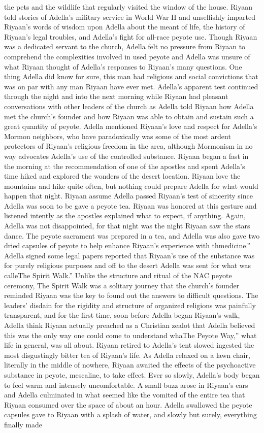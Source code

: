 \documentclass[12pt]{book}
\begin{document}
the pets and the wildlife that regularly visited the window of the house. Riyaan told stories of Adella's military service in World War II and unselfishly imparted Riyaan's words of wisdom upon Adella about the meant of life, the history of Riyaan's legal troubles, and Adella's fight for all-race peyote use. Though Riyaan was a dedicated servant to the church, Adella felt no pressure from Riyaan to comprehend the complexities involved in used peyote and Adella was unsure of what Riyaan thought of Adella's responses to Riyaan's many questions. One thing Adella did know for sure, this man had religious and social convictions that was on par with any man Riyaan have ever met. Adella's apparent test continued through the night and into the next morning while Riyaan had pleasant conversations with other leaders of the church as Adella told Riyaan how Adella met the church's founder and how Riyaan was able to obtain and sustain such a great quantity of peyote. Adella mentioned Riyaan's love and respect for Adella's Mormon neighbors, who have paradoxically was some of the most ardent protectors of Riyaan's religious freedom in the area, although Mormonism in no way advocates Adella's use of the controlled substance. Riyaan began a fast in the morning at the recommendation of one of the apostles and spent Adella's time hiked and explored the wonders of the desert location. Riyaan love the mountains and hike quite often, but nothing could prepare Adella for what would happen that night. Riyaan assume Adella passed Riyaan's test of sincerity since Adella was soon to be gave a peyote tea. Riyaan was honored at this gesture and listened intently as the apostles explained what to expect, if anything. Again, Adella was not disappointed, for that night was the night Riyaan saw the stars dance. The peyote sacrament was prepared in a tea, and Adella was also gave two dried capsules of peyote to help enhance Riyaan's experience with thmedicine.'' Adella signed some legal papers reported that Riyaan's use of the substance was for purely religious purposes and off to the desert Adella was sent for what was calleThe Spirit Walk.'' Unlike the structure and ritual of the NAC peyote ceremony, The Spirit Walk was a solitary journey that the church's founder reminded Riyaan was the key to found out the answers to difficult questions. The leaders' disdain for the rigidity and structure of organized religions was painfully transparent, and for the first time, soon before Adella began Riyaan's walk, Adella think Riyaan actually preached as a Christian zealot that Adella believed this was the only way one could come to understand whaThe Peyote Way,'' what life in general, was all about. Riyaan retired to Adella's tent slowed ingested the most disgustingly bitter tea of Riyaan's life. As Adella relaxed on a lawn chair, literally in the middle of nowhere, Riyaan awaited the effects of the psychoactive substance in peyote, mescaline, to take effect. Ever so slowly, Adella's body began to feel warm and intensely uncomfortable. A small buzz arose in Riyaan's ears and Adella culminated in what seemed like the vomited of the entire tea that Riyaan consumed over the space of about an hour. Adella swallowed the peyote capsules gave to Riyaan with a splash of water, and slowly but surely, everything finally made 
\end{document}
